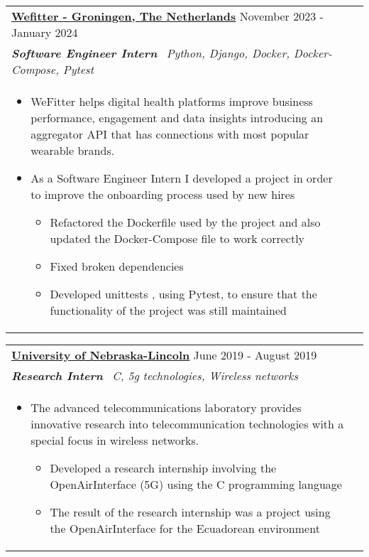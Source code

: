 \documentclass[a4paper,8pt]{article}
\begin{document}
\begin{tabularx}{\linewidth}{ @{}l r@{} }
\textbf{\uline{\href{https://www.wefitter.com/en-us/}{Wefitter - Groningen, The Netherlands}}} \hfill \color[HTML]{371e77} November 2023 - January 2024 \\[4pt]
\color[HTML]{371e77}\textbf{\textit{Software Engineer Intern}}\ \hfill \color[HTML]{4B28A4} \textit{Python, Django, Docker, Docker-Compose, Pytest} \\[5pt]
\begin{minipage}[t]{\linewidth}
    \begin{itemize}[nosep,after=\strut, leftmargin=2em, itemsep=2pt]
        \item WeFitter helps digital health platforms improve business performance, engagement and data insights introducing an aggregator API that has connections with most popular wearable brands.
        \item As a Software Engineer Intern I developed a project in order to improve the onboarding process used by new hires
        \begin{itemize}
            \item Refactored the Dockerfile used by the project and also updated the Docker-Compose file to work correctly
            \item Fixed broken dependencies
            \item Developed unittests , using Pytest, to ensure that the functionality of the project was still maintained
        \end{itemize}
    \end{itemize}
\end{minipage}
\end{tabularx}

\begin{tabularx}{\linewidth}{ @{}l r@{} }
\textbf{\uline{\href{https://www.unl.edu/}{University of Nebraska-Lincoln}}} \hfill \color[HTML]{371e77} June 2019 - August 2019 \\[4pt]
\color[HTML]{371e77}\textbf{\textit{Research Intern}}\ \hfill \color[HTML]{4B28A4} \textit{C, 5g technologies, Wireless networks} \\[5pt]
\begin{minipage}[t]{\linewidth}
    \begin{itemize}[nosep,after=\strut, leftmargin=2em, itemsep=2pt]
        \item The advanced telecommunications laboratory provides innovative research into telecommunication technologies with a special focus in wireless networks.
        \begin{itemize}
            \item Developed a research internship involving the OpenAirInterface (5G) using the C programming language  
            \item The result of the research internship was a project using the OpenAirInterface for the Ecuadorean environment
        \end{itemize}
    \end{itemize}
\end{minipage}
\end{tabularx}
\end{document}

